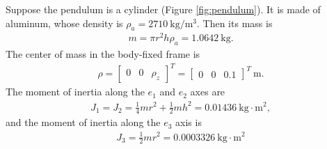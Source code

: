 \documentclass[10pt]{article}
\begin{document}
Suppose the pendulum is a cylinder (Figure \ref{fig:pendulum}).
It is made of aluminum, whose density is $\rho_a = \SI{2710}{\kilogram\per\meter^3}$.
Then its mass is
\begin{align}
	m = \pi r^2h\rho_a = \SI{1.0642}{\kilogram}.
\end{align}
The center of mass in the body-fixed frame is
\begin{align}
	\rho = \begin{bmatrix} 0 & 0 & \rho_z \end{bmatrix}^T = \begin{bmatrix} 0 & 0 & 0.1 \end{bmatrix}^T \SI{}{\meter}.
\end{align}
The moment of inertia along the $e_1$ and $e_2$ axes are
\begin{align}
	J_1 = J_2 = \tfrac{1}{4}mr^2 + \tfrac{1}{2}mh^2 = \SI{0.01436}{\kilogram\cdot\meter^2},
\end{align}
and the moment of inertia along the $e_3$ axis is
\begin{align}
	J_3 = \tfrac{1}{2}mr^2 = \SI{0.0003326}{\kilogram\cdot\meter^2}
\end{align}
\end{document}
